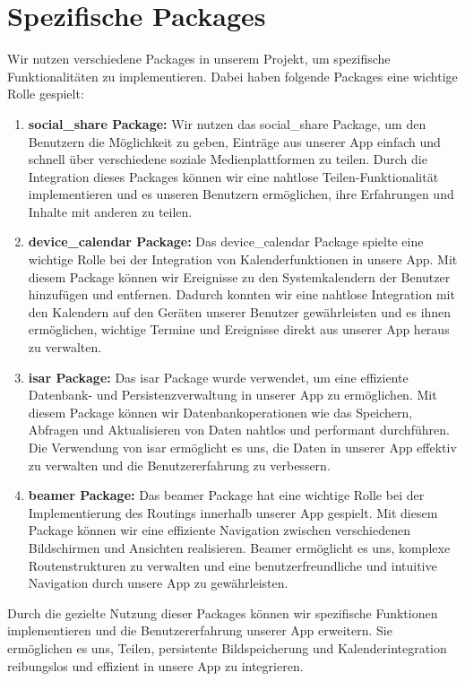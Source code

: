 \section{Spezifische Packages}
Wir nutzen verschiedene Packages in unserem Projekt, um spezifische Funktionalitäten zu implementieren. 
Dabei haben folgende Packages eine wichtige Rolle gespielt:

\begin{enumerate}
\item \textbf{social\_share Package:} Wir nutzen das social\_share Package, um den Benutzern die Möglichkeit zu geben, Einträge aus unserer App einfach und schnell über verschiedene soziale Medienplattformen zu teilen. Durch die Integration dieses Packages können wir eine nahtlose Teilen-Funktionalität implementieren und es unseren Benutzern ermöglichen, ihre Erfahrungen und Inhalte mit anderen zu teilen.

\item \textbf{device\_calendar Package:} Das device\_calendar Package spielte eine wichtige Rolle bei der Integration von Kalenderfunktionen in unsere App. Mit diesem Package können wir Ereignisse zu den Systemkalendern der Benutzer hinzufügen und entfernen. Dadurch konnten wir eine nahtlose Integration mit den Kalendern auf den Geräten unserer Benutzer gewährleisten und es ihnen ermöglichen, wichtige Termine und Ereignisse direkt aus unserer App heraus zu verwalten.

\item \textbf{isar Package:} Das isar Package wurde verwendet, um eine effiziente Datenbank- und Persistenzverwaltung in unserer App zu ermöglichen. Mit diesem Package können wir Datenbankoperationen wie das Speichern, Abfragen und Aktualisieren von Daten nahtlos und performant durchführen. Die Verwendung von isar ermöglicht es uns, die Daten in unserer App effektiv zu verwalten und die Benutzererfahrung zu verbessern.

\item \textbf{beamer Package:} Das beamer Package hat eine wichtige Rolle bei der Implementierung des Routings innerhalb unserer App gespielt. Mit diesem Package können wir eine effiziente Navigation zwischen verschiedenen Bildschirmen und Ansichten realisieren. Beamer ermöglicht es uns, komplexe Routenstrukturen zu verwalten und eine benutzerfreundliche und intuitive Navigation durch unsere App zu gewährleisten.

\end{enumerate}

Durch die gezielte Nutzung dieser Packages können wir spezifische Funktionen implementieren und die Benutzererfahrung unserer App erweitern. 
Sie ermöglichen es uns, Teilen, persistente Bildspeicherung und Kalenderintegration reibungslos und effizient in unsere App zu integrieren.

